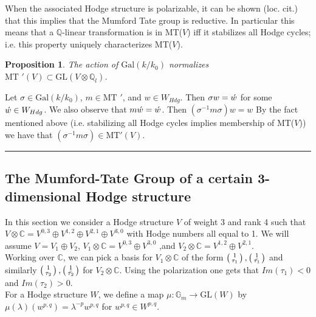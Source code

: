 \documentclass[12pt,titlepage]{article}
\newenvironment{proof}{\medskip {\it Proof.\ }}{\ \rule[-0.5mm]{1mm}
          {3.5mm}\medskip\noindent}
\newtheorem{proposition}[lem]{Proposition}
\begin{document}
When the associated Hodge structure is polarizable, it can be
shown (loc. cit.) that this implies that the Mumford Tate group is
reductive.  In particular this means that a $\mathbb{Q}$-linear
transformation is in MT($V$) iff it stabilizes all Hodge cycles;
i.e. this property uniquely characterizes MT($V$).

\begin{proposition}
  The action of $\text{Gal}(k/k_0)$ normalizes \\
  $\text{MT }'(V) \subset \text{GL}(V \otimes \mathbb{Q}_{l})$.
\end{proposition}

\noindent
\begin{proof}
  Let $\sigma \in \text{Gal}(k/k_0)$, $m \in \text{MT }'$, and $w \in W_{Hdg}$.  Then $\sigma w = \Acute{w}$ for some
  $\Acute{w} \in W_{Hdg}$.  We also observe that $m\Acute{w} = \Acute{w}$.  Then $(\sigma^{-1}m\sigma)w = w$
  By the
fact mentioned above (i.e. stabilizing all Hodge cycles implies
membership of MT($V$)) we have that $(\sigma^{-1}m\sigma) \in
\text{MT}'(V)$.
\end{proof}

\subsection{The Mumford-Tate Group of a certain 3-dimensional Hodge
structure}

In this section we consider a Hodge structure $V$ of weight 3 and
rank 4 such that $V \otimes \mathbb{C} = V^{0,3} \oplus V^{1,2}
\oplus V^{2,1} \oplus V^{3,0}$ with Hodge numbers all equal to 1.
We will assume $V = V_1 \oplus V_2$, $V_1 \otimes \mathbb{C} =
V^{0,3} \oplus V^{3,0}$
,and $V_2 \otimes \mathbb{C} = V^{1,2} \oplus V^{2,1}$.\\
Working over $\mathbb{C}$, we can pick a basis for $V_1 \otimes \mathbb{C}$ of the form
$\left( \begin{smallmatrix} 1 \\ \tau_1 \end{smallmatrix} \right),
\left( \begin{smallmatrix} 1 \\ \Bar{\tau_1} \end{smallmatrix} \right)$
and similarly
$\left( \begin{smallmatrix} 1 \\ \tau_2 \end{smallmatrix} \right),
\left( \begin{smallmatrix} 1 \\ \Bar{\tau_2} \end{smallmatrix} \right)$
for $V_2 \otimes \mathbb{C}$.
Using the polarization one gets that $Im(\tau_1)<0$ and $Im(\tau_2)>0$.\\
For a Hodge structure $W$, we define a map $\mu: \mathbb{G}_{m} \rightarrow \text{GL}(W)$ by
$\mu (\lambda)(w^{p,q}) = \lambda^{-p} w^{p,q}$ for $w^{p,q} \in W^{p,q}$.
\end{document}
